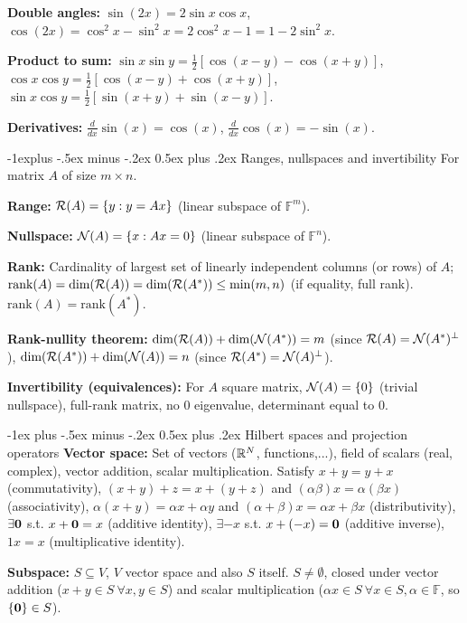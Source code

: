 \documentclass{article}
\makeatletter
\renewcommand{\section}{\@startsection{section}{1}{0mm}%
                                {-1ex plus -.5ex minus -.2ex}%
                                {0.5ex plus .2ex}%
                                {\color{blue!60}\normalfont\normalsize\bfseries}}
\renewcommand{\subsection}{\@startsection{subsection}{2}{0mm}%
                                {-1explus -.5ex minus -.2ex}%
                                {0.5ex plus .2ex}%
                                {\color{red!50!yellow}\normalfont\small\bfseries}}
\makeatother
\begin{document}
\begin{multicols*}{3}
    \textbf{Double angles: }$\sin(2x) = 2 \sin x \cos x$, $\cos(2x) = \cos^2 x -\sin^2 x = 2 \cos^2 x - 1 = 1 - 2 \sin^2 x$.
    
    \textbf{Product to sum: }$\sin x\sin y=\frac{1}{2}[\cos(x-y)-\cos(x+y)]$, $\cos x \cos y = \frac{1}{2}[\cos(x-y)+\cos(x+y)]$, $\sin x \cos y=\frac{1}{2}[\sin(x+y)+\sin(x-y)]$.
    
    \textbf{Derivatives: }$\frac{d}{dx}\sin(x)=\cos(x)$, $\frac{d}{dx}\cos(x)=-\sin(x)$.
    
    \subsection{Ranges, nullspaces and invertibility}
    For matrix $A$ of size $m\times n$.
    
    \textbf{Range: }$\mathcal{R}(A)=\{y:y=Ax\}$ (linear subspace of $\mathbb{F}^m$).
    
    \textbf{Nullspace: }$\mathcal{N}(A)=\{x:Ax=0\}$ (linear subspace of $\mathbb{F}^n$).
    
    \textbf{Rank: }Cardinality of largest set of linearly independent columns (or rows) of $A$; $\text{rank}(A)=\text{dim}(\mathcal{R}(A))=\text{dim}(\mathcal{R}(A^*))\leq \min(m,n)$ (if equality, full rank). $\text{rank}(A)=\text{rank}(A^*)$.
    
    \textbf{Rank-nullity theorem: }$\text{dim}(\mathcal{R}(A))+\text{dim}(\mathcal{N}(A^*))=m$ (since $\mathcal{R}(A)=\mathcal{N}(A^*)^\perp$), $\text{dim}(\mathcal{R}(A^*))+\text{dim}(\mathcal{N}(A))=n$ (since $\mathcal{R}(A^*)=\mathcal{N}(A)^\perp$).
    
    \textbf{Invertibility (equivalences): }For $A$ square matrix, $\mathcal{N}(A)=\{0\}$ (trivial nullspace), full-rank matrix, no 0 eigenvalue, determinant equal to 0.
    
    \section{Hilbert spaces and projection operators}
    \textbf{Vector space: }Set of vectors ($\mathbb{R}^N$, functions,...), field of scalars (real, complex), vector addition, scalar multiplication. Satisfy $x+y=y+x$ (commutativity), $(x+y)+z=x+(y+z)$ and $(\alpha\beta) x=\alpha(\beta x)$ (associativity), $\alpha(x+y)=\alpha x+ \alpha y$ and $(\alpha+\beta)x=\alpha x + \beta x$ (distributivity), $\exists\mathbf{0}$ s.t. $x+\mathbf{0}=x$ (additive identity), $\exists-x$ s.t. $x+(-x)=\mathbf{0}$ (additive inverse), $1x=x$ (multiplicative identity).
    
     \textbf{Subspace: }$S\subseteq V$, $V$ vector space and also $S$ itself. $S\neq \emptyset$, closed under vector addition ($x+y\in S \ \forall x,y\in S$) and scalar multiplication ($\alpha x \in S \ \forall x\in S,\alpha\in \mathbb{F}$, so $\{\mathbf{0}\}\in S$).
     

\end{multicols*}
\end{document}
